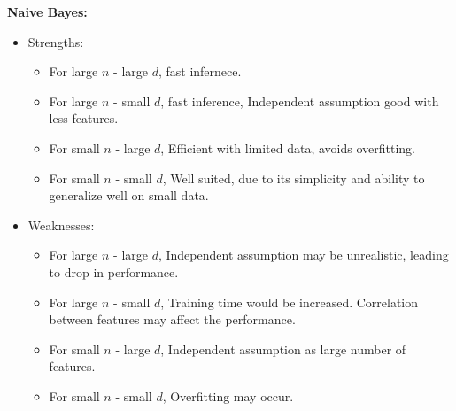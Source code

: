 \documentclass[12pt]{article}
\begin{document}
\textbf{Naive Bayes:}
\begin{itemize}
   \item Strengths:
            \begin{itemize}
                \item For large $n$ - large $d$, fast infernece.
                \item For large $n$ - small $d$, fast inference, Independent assumption good with less features.
                \item For small $n$ - large $d$, Efficient with limited data, avoids overfitting.
                \item For small $n$ - small $d$, Well suited, due to its simplicity and ability to generalize well on small data.
            \end{itemize}
    \item Weaknesses:
            \begin{itemize}
                \item For large $n$ - large $d$, Independent assumption may be unrealistic, leading to drop in performance.
                \item For large $n$ - small $d$, Training time would be increased. Correlation between features may affect the performance.
                \item For small $n$ - large $d$, Independent assumption as large number of features.
                \item For small $n$ - small $d$, Overfitting may occur.
            \end{itemize}
\end{itemize}
\end{document}
